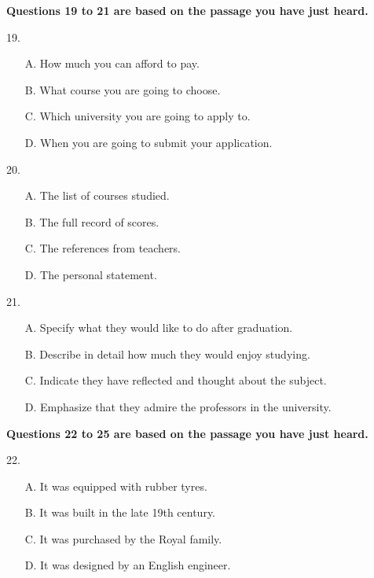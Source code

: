 \documentclass[UTF8,11pt]{ctexart}
\begin{document}
\textbf{Questions 19 to 21 are based on the passage you have just heard.}


19.


\begin{itemize}[leftmargin=2em,itemsep=.2em,topsep=.4em]\item[A.] How much you can afford to pay.
\item[B.] What course you are going to choose.
\item[C.] Which university you are going to apply to.
\item[D.] When you are going to submit your application.
\end{itemize}

20.


\begin{itemize}[leftmargin=2em,itemsep=.2em,topsep=.4em]\item[A.] The list of courses studied.
\item[B.] The full record of scores.
\item[C.] The references from teachers.
\item[D.] The personal statement.
\end{itemize}

21.


\begin{itemize}[leftmargin=2em,itemsep=.2em,topsep=.4em]\item[A.] Specify what they would like to do after graduation.
\item[B.] Describe in detail how much they would enjoy studying.
\item[C.] Indicate they have reflected and thought about the subject.
\item[D.] Emphasize that they admire the professors in the university.
\end{itemize}

\textbf{Questions 22 to 25 are based on the passage you have just heard.}


22.


\begin{itemize}[leftmargin=2em,itemsep=.2em,topsep=.4em]\item[A.] It was equipped with rubber tyres.
\item[B.] It was built in the late 19th century.
\item[C.] It was purchased by the Royal family.
\item[D.] It was designed by an English engineer.
\end{itemize}
\end{document}
